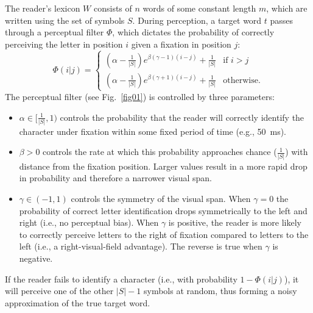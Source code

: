 \documentclass[doc,biblatex,floatsintext]{apa7}
\begin{document}
The reader's lexicon $W$ consists of $n$ words of some constant length $m$, which are written using the set of symbols $S$. During perception, a target word $t$ passes through a perceptual filter $\Phi$, which dictates the probability of correctly perceiving the letter in position $i$ given a fixation in position $j$:
\begin{equation}
\Phi(i|j) =
\begin{cases}
    (\alpha - \frac{1}{|S|}) e^{ \beta (\gamma - 1) (i - j) } + \frac{1}{|S|} & \text{if $i > j$} \\
    (\alpha - \frac{1}{|S|}) e^{ \beta (\gamma + 1) (i - j) } + \frac{1}{|S|} & \text{otherwise.}
\end{cases}
\label{eq_filter}
\end{equation}
The perceptual filter (see Fig.~\ref{fig01}) is controlled by three parameters:
\begin{itemize}
    \item $\alpha \in [\frac{1}{|S|}, 1)$ controls the probability that the reader will correctly identify the character under fixation within some fixed period of time (e.g., 50~ms).
    \item $\beta > 0$ controls the rate at which this probability approaches chance ($\frac{1}{|S|}$) with distance from the fixation position. Larger values result in a more rapid drop in probability and therefore a narrower visual span.
    \item $\gamma \in (-1, 1)$ controls the symmetry of the visual span. When $\gamma = 0$ the probability of correct letter identification drops symmetrically to the left and right (i.e., no perceptual bias). When $\gamma$ is positive, the reader is more likely to correctly perceive letters to the right of fixation compared to letters to the left (i.e., a right-visual-field advantage). The reverse is true when $\gamma$ is negative.
\end{itemize}
If the reader fails to identify a character (i.e., with probability $1 - \Phi(i|j)$), it will perceive one of the other $|S|-1$ symbols at random, thus forming a noisy approximation of the true target word.
\end{document}
